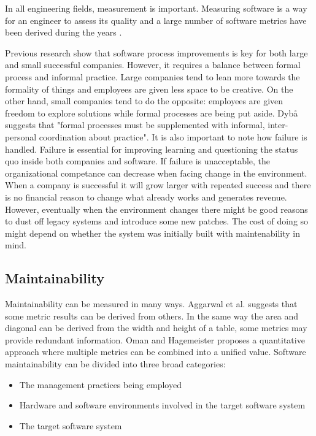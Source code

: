 In all engineering fields, measurement is important. Measuring software is a
way for an engineer to assess its quality and a large number of software
metrics have been derived during the years \cite{aggarwal2006empirical}.

Previous research show that software process improvements is key for both large
and small successful companies. However, it requires a balance between formal
process and informal practice. Large companies tend to lean more towards the
formality of things and employees are given less space to be creative. On the
other hand, small companies tend to do the opposite: employees are given
freedom to explore solutions while formal processes are being put aside. Dybå
\cite{dybaa2003factors} suggests that "formal processes must be supplemented
with informal, inter-personal coordination about practice". It is also
important to note how failure is handled. Failure is essential for improving
learning and questioning the status quo inside both companies and software. If
failure is unacceptable, the organizational competance can decrease when facing
change in the environment. When a company is successful it will grow larger
with repeated success and there is no financial reason to change what already
works and generates revenue. However, eventually when the environment changes
there might be good reasons to dust off legacy systems and introduce some new
patches. The cost of doing so might depend on whether the system was initially
built with maintenability in mind. \cite{dybaa2003factors}

\subsection{Maintainability}

Maintainability can be measured in many ways. Aggarwal et al.
\cite{aggarwal2006empirical} suggests that some metric results can be derived
from others. In the same way the area and diagonal can be derived from the
width and height of a table, some metrics may provide redundant information.
Oman and Hagemeister \cite{oman1992metrics} proposes a quantitative approach
where multiple metrics can be combined into a unified value. Software
maintainability can be divided into three broad categories:

\begin{itemize}
\item The management practices being employed
\item Hardware and software environments involved in the target software system
\item The target software system
\end{itemize}

